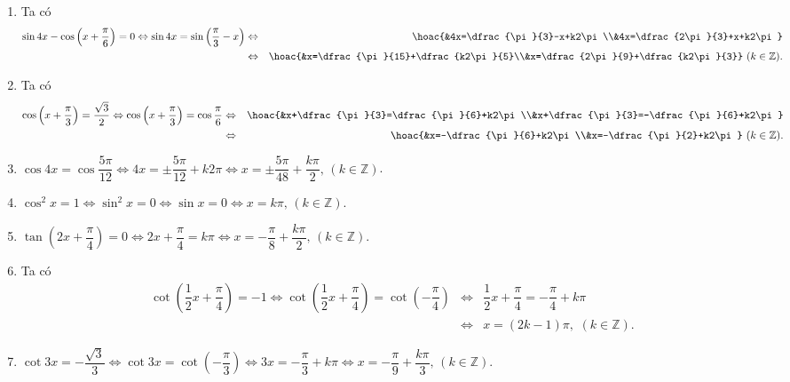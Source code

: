 \begin{bt}
{\begin{enumerate}
			\item Ta có
			\allowdisplaybreaks
			\begin{eqnarray*}
				\sin4x-\cos \left(x+\dfrac{\pi}{6}\right)=0 \Leftrightarrow \sin4x=\sin\left(\dfrac{\pi}{3}-x\right)
				&\Leftrightarrow&
				\hoac{&4x=\dfrac{\pi}{3}-x+k2\pi\\&4x=\dfrac{2\pi}{3}+x+k2\pi}\\
				&\Leftrightarrow& \hoac{&x=\dfrac{\pi}{15}+\dfrac{k2\pi}{5}\\&x=\dfrac{2\pi}{9}+\dfrac{k2\pi}{3}}\,\, (k\in\mathbb{Z}).
			\end{eqnarray*}
			\item Ta có
			\allowdisplaybreaks
			\begin{eqnarray*}
				\cos \left(x+\dfrac{\pi}{3}\right) = \dfrac{\sqrt{3}}{2} \Leftrightarrow \cos\left(x+\dfrac{\pi}{3}\right)=\cos\dfrac{\pi}{6} &\Leftrightarrow& \hoac{&x+\dfrac{\pi}{3}=\dfrac{\pi}{6}+k2\pi\\&x+\dfrac{\pi}{3}=-\dfrac{\pi}{6}+k2\pi}\\
				&\Leftrightarrow& \hoac{&x=-\dfrac{\pi}{6}+k2\pi\\&x=-\dfrac{\pi}{2}+k2\pi}\,\,(k\in\mathbb{Z}).
			\end{eqnarray*}
			\item $\cos 4 x=\cos \dfrac{5 \pi}{12}\Leftrightarrow4x=\pm\dfrac{5\pi}{12}+k2\pi\Leftrightarrow x=\pm\dfrac{5\pi}{48}+\dfrac{k\pi}{2},\,(k\in\mathbb{Z})$.
			\item $\cos^2x=1\Leftrightarrow\sin^2x=0\Leftrightarrow\sin x=0\Leftrightarrow x=k\pi,\,(k\in\mathbb{Z})$.
			\item $\tan \left(2 x+\dfrac{\pi}{4}\right)=0\Leftrightarrow2x+\dfrac{\pi}{4}=k\pi\Leftrightarrow x=-\dfrac{\pi}{8}+\dfrac{k\pi}{2},\,(k\in\mathbb{Z})$.
			\item Ta có
			\allowdisplaybreaks
			\begin{eqnarray*}
				\cot \left(\dfrac{1}{2} x+\dfrac{\pi}{4}\right)=-1 \Leftrightarrow \cot\left(\dfrac{1}{2}x+\dfrac{\pi}{4}\right)=\cot\left(-\dfrac{\pi}{4}\right) &\Leftrightarrow& \dfrac{1}{2}x+\dfrac{\pi}{4}=-\dfrac{\pi}{4}+k\pi\\
				&\Leftrightarrow& x=(2k-1)\pi,\,\,(k\in\mathbb{Z}).
			\end{eqnarray*}
			\item $\cot3x=-\dfrac{\sqrt{3}}{3}\Leftrightarrow\cot3x=\cot\left(-\dfrac{\pi}{3}\right)\Leftrightarrow3x=-\dfrac{\pi}{3}+k\pi\Leftrightarrow x=-\dfrac{\pi}{9}+\dfrac{k\pi}{3},\,(k\in\mathbb{Z})$.
		\end{enumerate}
	}
\end{bt}

